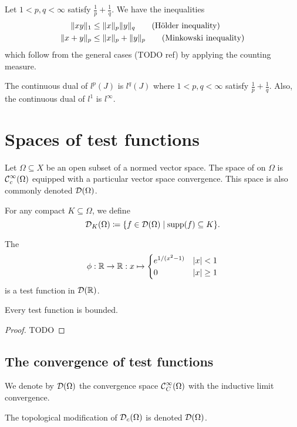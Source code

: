 Let $1<p,q<\infty$ satisfy $\frac{1}{p}+\frac{1}{q}$. We have the inequalities
\begin{align*}
\lVert xy\rVert_1 &\leq \lVert x\rVert_p\lVert y\rVert_q\qquad\text{(Hölder inequality)} \\
\lVert x+y\rVert_p &\leq \lVert x\rVert_p+\lVert y\rVert_p\qquad\text{(Minkowski inequality)}
\end{align*}
which follow from the general cases (TODO ref) by applying the counting measure.

\begin{proposition}
The continuous dual of $l^p(J)$ is $l^q(J)$ where $1<p,q<\infty$ satisfy $\frac{1}{p}+\frac{1}{q}$.
Also, the continuous dual of $l^1$ is $l^\infty$.
\end{proposition}


\section{Spaces of test functions}
\begin{definition}
Let $\Omega\subseteq X$ be an open subset of a normed vector space. The space of  on $\Omega$ is $\operatorname{\mathcal{C}}^\infty_c(\Omega)$ equipped with a particular vector space convergence. This space is also commonly denoted $\operatorname{\mathcal{D}}(\Omega)$.

For any compact $K\subseteq \Omega$, we define
\[ \testFuncs_K(\Omega) \defeq \setbuilder{f\in \testFuncs(\Omega)}{\supp(f) \subseteq K}. \]
\end{definition}

\begin{example}
The 
\[ \phi: \mathbb{R}\to\mathbb{R}: x\mapsto \begin{cases}
e^{1/(x^2-1)} & |x|<1 \\ 0 & |x| \geq 1
\end{cases} \]
is a test function in $\operatorname{\mathcal{D}}(\mathbb{R})$.
\end{example}

\begin{lemma}
Every test function is bounded.
\end{lemma}
\begin{proof}
TODO
\end{proof}

\subsection{The convergence of test functions}

\begin{definition}
We denote by $\operatorname{\mathcal{D}}(\Omega)$ the convergence space $\operatorname{\mathcal{C}}^\infty_C(\Omega)$ with the inductive limit convergence.

The topological modification of $\operatorname{\mathcal{D}}_c(\Omega)$ is denoted $\operatorname{\mathcal{D}}(\Omega)$.
\end{definition}

